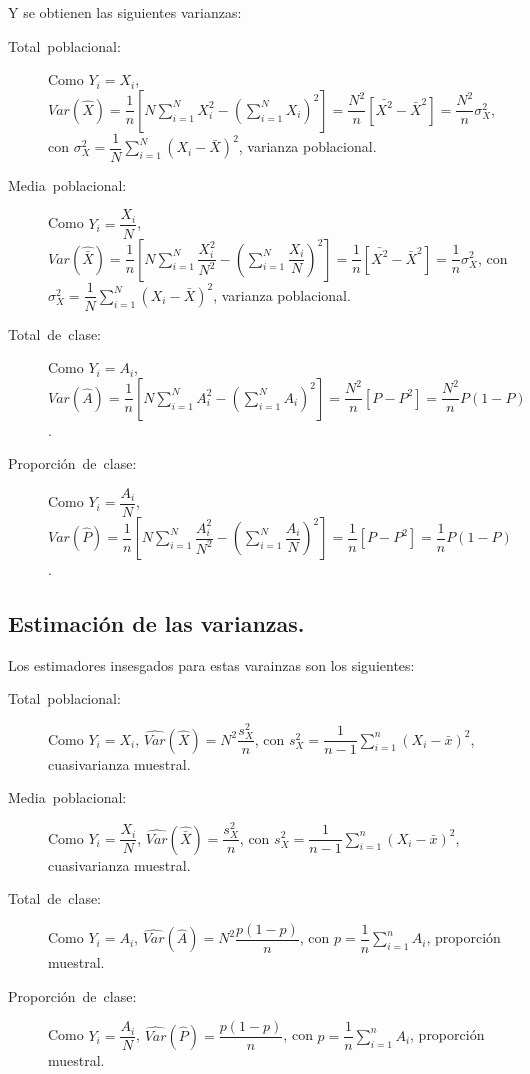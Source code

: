 Y se obtienen las siguientes varianzas:
\begin{description}
\item [{Total~poblacional:}] Como $Y_{i}=X_{i}$, $Var\left(\hat{X}\right)=\dfrac{1}{n}\left[N\sum_{i=1}^{N}X_{i}^{2}-\left(\sum_{i=1}^{N}X_{i}\right)^{2}\right]=\dfrac{N^{2}}{n}\left[\bar{X^{2}}-\bar{X}^{2}\right]=\dfrac{N^{2}}{n}\sigma_{X}^{2}$,
con $\sigma_{X}^{2}=\dfrac{1}{N}\sum_{i=1}^{N}\left(X_{i}-\bar{X}\right)^{2}$,
varianza poblacional.
\item [{Media~poblacional:}] Como $Y_{i}=\dfrac{X_{i}}{N}$, $Var\left(\hat{\bar{X}}\right)=\dfrac{1}{n}\left[N\sum_{i=1}^{N}\dfrac{X_{i}^{2}}{N^{2}}-\left(\sum_{i=1}^{N}\dfrac{X_{i}}{N}\right)^{2}\right]=\dfrac{1}{n}\left[\bar{X^{2}}-\bar{X}^{2}\right]=\dfrac{1}{n}\sigma_{X}^{2}$,
con $\sigma_{X}^{2}=\dfrac{1}{N}\sum_{i=1}^{N}\left(X_{i}-\bar{X}\right)^{2}$,
varianza poblacional.
\item [{Total~de~clase:}] Como $Y_{i}=A_{i}$, $Var\left(\hat{A}\right)=\dfrac{1}{n}\left[N\sum_{i=1}^{N}A_{i}^{2}-\left(\sum_{i=1}^{N}A_{i}\right)^{2}\right]=\dfrac{N^{2}}{n}\left[P-P^{2}\right]=\dfrac{N^{2}}{n}P(1-P)$.
\item [{Proporci\'on~de~clase:}] Como $Y_{i}=\dfrac{A_{i}}{N}$, $Var\left(\hat{P}\right)=\dfrac{1}{n}\left[N\sum_{i=1}^{N}\dfrac{A_{i}^{2}}{N^{2}}-\left(\sum_{i=1}^{N}\dfrac{A_{i}}{N}\right)^{2}\right]=\dfrac{1}{n}\left[P-P^{2}\right]=\dfrac{1}{n}P(1-P)$.
\end{description}

\subsection{Estimaci\'on de las varianzas.}

Los estimadores insesgados para estas varainzas son los siguientes:
\begin{description}
\item [{Total~poblacional:}] Como $Y_{i}=X_{i}$, $\hat{Var}\left(\hat{X}\right)=N^{2}\dfrac{s_{X}^{2}}{n}$,
con $s_{X}^{2}=\dfrac{1}{n-1}\sum_{i=1}^{n}\left(X_{i}-\bar{x}\right)^{2}$,
cuasivarianza muestral.
\item [{Media~poblacional:}] Como $Y_{i}=\dfrac{X_{i}}{N}$, $\hat{Var}\left(\hat{\bar{X}}\right)=\dfrac{s_{X}^{2}}{n}$,
con $s_{X}^{2}=\dfrac{1}{n-1}\sum_{i=1}^{n}\left(X_{i}-\bar{x}\right)^{2}$,
cuasivarianza muestral.
\item [{Total~de~clase:}] Como $Y_{i}=A_{i}$, $\hat{Var}\left(\hat{A}\right)=N^{2}\dfrac{p\left(1-p\right)}{n}$,
con $p=\dfrac{1}{n}\sum_{i=1}^{n}A_{i}$, proporci\'on muestral.
\item [{Proporci\'on~de~clase:}] Como $Y_{i}=\dfrac{A_{i}}{N}$, $\hat{Var}\left(\hat{P}\right)=\dfrac{p\left(1-p\right)}{n}$,
con $p=\dfrac{1}{n}\sum_{i=1}^{n}A_{i}$, proporci\'on muestral.
\end{description}

